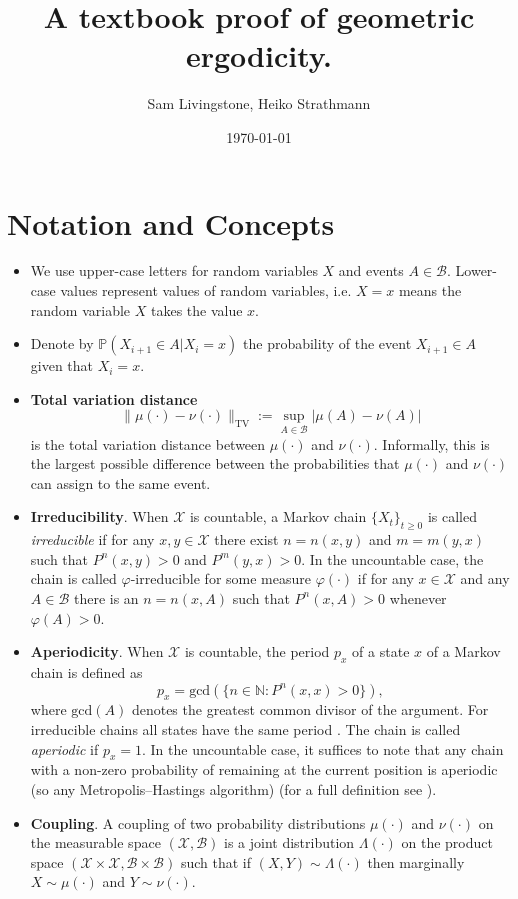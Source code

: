 \documentclass{article}
\title{\Large \bfseries A textbook proof of geometric ergodicity.}
\author{Sam Livingstone, Heiko Strathmann}
\date{\today}
\newcommand{\ch}[1]{ \{#1_t\}_{t \geq 0} }
\newcommand{\X}{\mathcal{X}}
\newcommand{\B}{\mathcal{B}}
\newcommand{\TV}{\text{TV}}
\begin{document}
\maketitle

\listoftodos

\section{Notation and Concepts}

\begin{itemize}
\item We use upper-case letters for random variables $X$ and events $A\in \mathcal{B}$. Lower-case values represent values of random variables, i.e. $X=x$ means the random variable $X$ takes the value $x$.
\item Denote by $\mathbb{P}(X_{i+1} \in A |X_i = x)$ the probability of the event $X_{i+1} \in A$ given that $X_i = x$.
\item \textbf{Total variation distance}
\begin{equation*}
\|\mu(\cdot) - \nu(\cdot)\|_{\TV} := \sup_{A \in \mathcal{B}} |\mu(A) - \nu(A)|
\end{equation*}
is the total variation distance between $\mu(\cdot)$ and $\nu(\cdot)$. Informally, this is the largest possible difference between the probabilities that $\mu(\cdot)$ and $\nu(\cdot)$ can assign to the same event.
\item \textbf{Irreducibility}. When $\X$ is countable, a Markov chain $\ch{X}$ is called \emph{irreducible} if for any $x,y \in \X$ there exist $n = n(x,y)$ and $m = m(y,x)$ such that $P^n(x,y)>0$ and $P^m(y,x) > 0$.  In the uncountable case, the chain is called $\varphi$-irreducible for some measure $\varphi(\cdot)$ if for any $x \in \X$ and any $A \in \B$ there is an $n = n(x,A)$ such that $P^n(x,A) > 0$ whenever $\varphi(A) > 0$.
\item \textbf{Aperiodicity}. When $\X$ is countable, the period $p_x$ of a state $x$ of a Markov chain is defined as
\[
p_x = \text{gcd}(\{ n \in \mathbb{N} : P^n(x,x) > 0 \}),
\]
where $\text{gcd}(A)$ denotes the greatest common divisor of the argument.  For irreducible chains all states have the same period \cite{norris1997markov}.  The chain is called \emph{aperiodic} if $p_x = 1$.  In the uncountable case, it suffices to note that any chain with a non-zero probability of remaining at the current position is aperiodic (so any Metropolis--Hastings algorithm) (for a full definition see \cite{tierney1994markov}).
\item \textbf{Coupling}.  A coupling of two probability distributions $\mu(\cdot)$ and $\nu(\cdot)$  on the measurable space $(\X,\B)$ is a joint distribution $\Lambda(\cdot)$ on the product space $(\X \times \X,\B \times \B)$ such that if $(X,Y) \sim \Lambda(\cdot)$ then marginally $X \sim \mu(\cdot)$ and $Y \sim \nu(\cdot)$.

\end{itemize}
\end{document}

